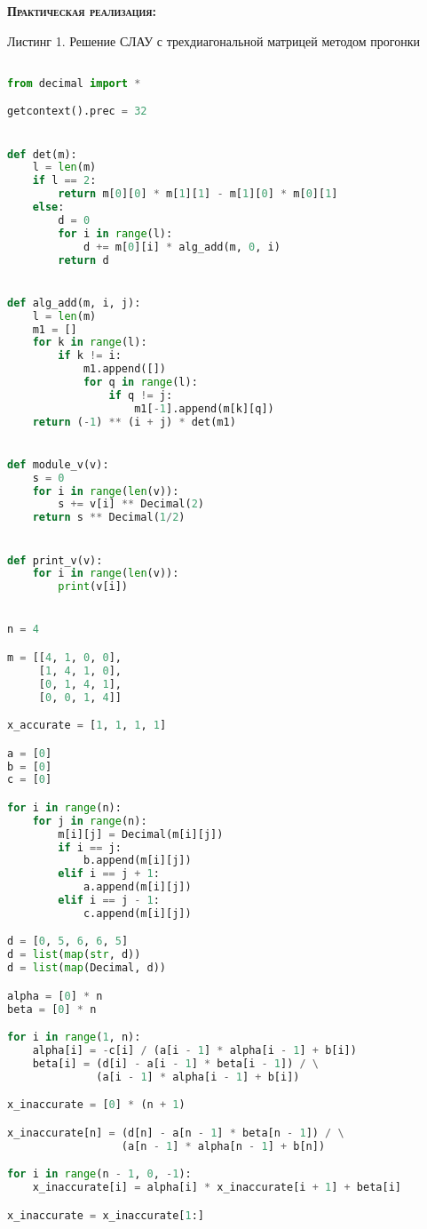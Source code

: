 \documentclass [12pt]{article}
\begin{document}
\textsc{\textbf{Практическая реализация:}}

Листинг 1. Решение СЛАУ с трехдиагональной матрицей методом прогонки
\begin{lstlisting}[language=python]

from decimal import *

getcontext().prec = 32


def det(m):
    l = len(m)
    if l == 2:
        return m[0][0] * m[1][1] - m[1][0] * m[0][1]
    else:
        d = 0
        for i in range(l):
            d += m[0][i] * alg_add(m, 0, i)
        return d


def alg_add(m, i, j):
    l = len(m)
    m1 = []
    for k in range(l):
        if k != i:
            m1.append([])
            for q in range(l):
                if q != j:
                    m1[-1].append(m[k][q])
    return (-1) ** (i + j) * det(m1)


def module_v(v):
    s = 0
    for i in range(len(v)):
        s += v[i] ** Decimal(2)
    return s ** Decimal(1/2)


def print_v(v):
    for i in range(len(v)):
        print(v[i])


n = 4

m = [[4, 1, 0, 0],
     [1, 4, 1, 0],
     [0, 1, 4, 1],
     [0, 0, 1, 4]]

x_accurate = [1, 1, 1, 1]

a = [0]
b = [0]
c = [0]

for i in range(n):
    for j in range(n):
        m[i][j] = Decimal(m[i][j])
        if i == j:
            b.append(m[i][j])
        elif i == j + 1:
            a.append(m[i][j])
        elif i == j - 1:
            c.append(m[i][j])

d = [0, 5, 6, 6, 5]
d = list(map(str, d))
d = list(map(Decimal, d))

alpha = [0] * n
beta = [0] * n

for i in range(1, n):
    alpha[i] = -c[i] / (a[i - 1] * alpha[i - 1] + b[i])
    beta[i] = (d[i] - a[i - 1] * beta[i - 1]) / \
              (a[i - 1] * alpha[i - 1] + b[i])

x_inaccurate = [0] * (n + 1)

x_inaccurate[n] = (d[n] - a[n - 1] * beta[n - 1]) / \
                  (a[n - 1] * alpha[n - 1] + b[n])

for i in range(n - 1, 0, -1):
    x_inaccurate[i] = alpha[i] * x_inaccurate[i + 1] + beta[i]

x_inaccurate = x_inaccurate[1:]


\end{lstlisting}
\end{document}
